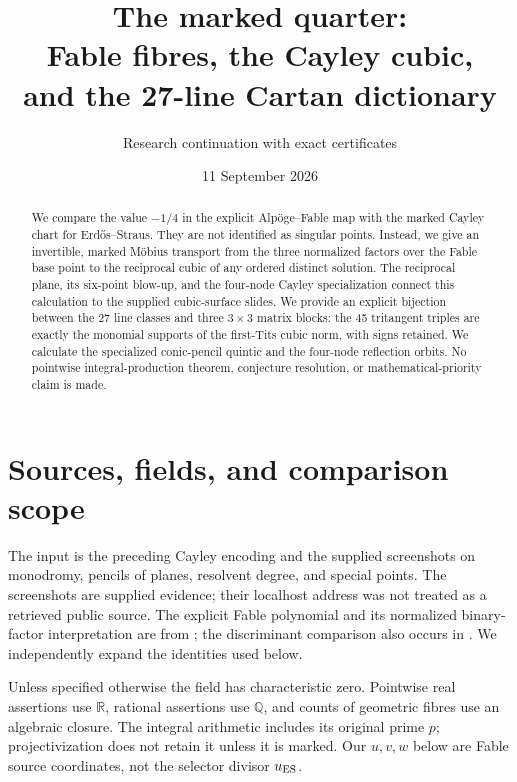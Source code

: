 \documentclass[11pt]{article}
\title{The marked quarter:\\Fable fibres, the Cayley cubic,\\and the 27-line Cartan dictionary}
\author{Research continuation with exact certificates}
\date{11 September 2026}
\theoremstyle{remark}\newtheorem{remark}[theorem]{Remark}
\newcommand{\Q}{\mathbb Q}\newcommand{\C}{\mathbb C}\newcommand{\Z}{\mathbb Z}
\begin{document}
\maketitle
\begin{abstract}
We compare the value $-1/4$ in the explicit Alp\"oge--Fable map with the marked Cayley chart for Erd\H{o}s--Straus. They are not identified as singular points. Instead, we give an invertible, marked M\"obius transport from the three normalized factors over the Fable base point to the reciprocal cubic of any ordered distinct solution. The reciprocal plane, its six-point blow-up, and the four-node Cayley specialization connect this calculation to the supplied cubic-surface slides. We provide an explicit bijection between the 27 line classes and three $3\times3$ matrix blocks: the 45 tritangent triples are exactly the monomial supports of the first-Tits cubic norm, with signs retained. We calculate the specialized conic-pencil quintic and the four-node reflection orbits. No pointwise integral-production theorem, conjecture resolution, or mathematical-priority claim is made.
\end{abstract}

\section{Sources, fields, and comparison scope}
The input is the preceding Cayley encoding and the supplied screenshots on monodromy, pencils of planes, resolvent degree, and special points. The screenshots are supplied evidence; their localhost address was not treated as a retrieved public source. The explicit Fable polynomial and its normalized binary-factor interpretation are from \citet[eqs.~(1), (2), (5), (7), (10)]{tao}; the discriminant comparison also occurs in \citet[displayed elimination equations]{speyer}. We independently expand the identities used below.

Unless specified otherwise the field has characteristic zero. Pointwise real assertions use $\mathbb R$, rational assertions use $\Q$, and counts of geometric fibres use an algebraic closure. The integral arithmetic includes its original prime $p$; projectivization does not retain it unless it is marked. Our $u,v,w$ below are Fable source coordinates, not the selector divisor $u_{\rm ES}$.
\end{document}
